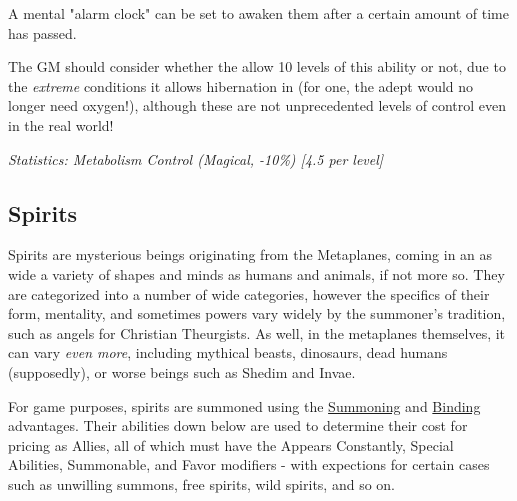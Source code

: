 \begin{multicols*}{3}
		A mental "alarm clock" can be set to awaken them after a certain amount of time has passed.
		
		The GM should consider whether the allow 10 levels of this ability or not, due to the \textit{extreme} conditions it allows hibernation in (for one, the adept would no longer need oxygen!), although these are not unprecedented levels of control even in the real world! 

		\textcolor{OliveGreen}{\textit{Statistics: Metabolism Control (Magical, -10\%) [4.5 per level] }}

	\subsection{Spirits}
	
	Spirits are mysterious beings originating from the Metaplanes, coming in an as wide a variety of shapes and minds as humans and animals, if not more so. They are categorized into a number of wide categories, however the specifics of their form, mentality, and sometimes powers vary widely by the summoner's tradition, such as angels for Christian Theurgists. As well, in the metaplanes themselves, it can vary \textit{even more}, including mythical beasts, dinosaurs, dead humans (supposedly), or worse beings such as Shedim and Invae.
	
	For game purposes, spirits are summoned using the \hyperref[summoning]{Summoning} and \hyperref[binding_spirits]{Binding} advantages. Their abilities down below are used to determine their cost for pricing as Allies, all of which must have the Appears Constantly, Special Abilities, Summonable, and Favor modifiers - with expections for certain cases such as unwilling summons, free spirits, wild spirits, and so on.
	

\end{multicols*}
